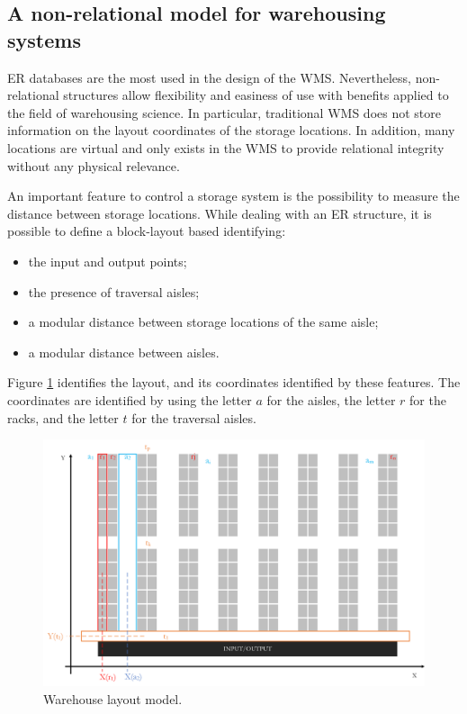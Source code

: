 \subsection{A non-relational model for warehousing systems}

ER databases are the most used in the design of the WMS. Nevertheless, non-relational structures allow flexibility and easiness of use with benefits applied to the field of warehousing science. In particular, traditional WMS does not store information on the layout coordinates of the storage locations. In addition, many locations are virtual and only exists in the WMS to provide relational integrity without any physical relevance. \par

An important feature to control a storage system is the possibility to measure the distance between storage locations. While dealing with an ER structure, it is possible to define a block-layout based identifying:

\begin{itemize}
    \item the input and output points;
    \item the presence of traversal aisles;
    \item a modular distance between storage locations of the same aisle;
    \item a modular distance between aisles.
\end{itemize}

Figure \ref{fig_layout_wh} identifies the layout, and its coordinates identified by these features. The coordinates are identified by using the letter $a$ for the aisles, the letter $r$ for the racks, and the letter $t$ for the traversal aisles.

\begin{figure}[hbt!]
\centering
\includegraphics[width=1\textwidth]{SectionWarehouses/diagnsticModels_figures/fig_layout.png}
\captionsetup{type=figure}
\caption{Warehouse layout model.}
\label{fig_layout_wh}
\end{figure}

